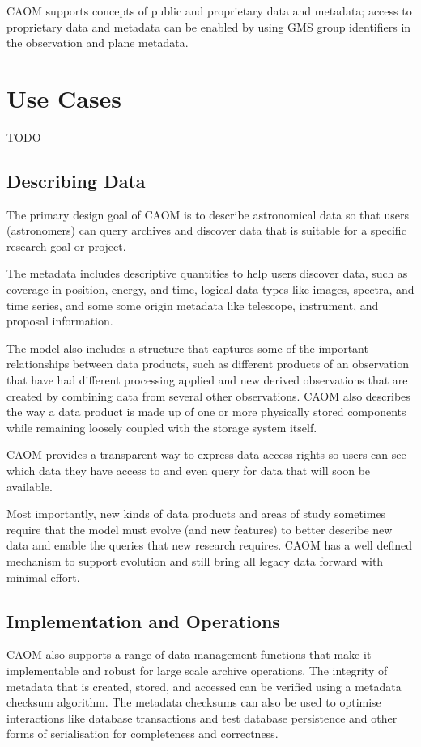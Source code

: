 \documentclass[11pt,a4paper]{ivoa}
\begin{document}
CAOM supports concepts of public and proprietary data and metadata; access to proprietary
data and metadata can be enabled by using GMS group identifiers in the observation and
plane metadata.

\section{Use Cases}

TODO

\subsection{Describing Data}

The primary design goal of CAOM is to describe astronomical data so that 
users (astronomers) can query archives and discover data that is suitable
for a specific research goal or project. 

The metadata includes descriptive quantities to help users discover data, 
such as coverage in position, energy, and time, logical data types like 
images, spectra, and time series, and some some origin metadata like 
telescope, instrument, and proposal information.

The model also includes a structure that captures some of the important relationships 
between data products, such as different products of an observation that have had
different processing applied and new derived observations that are created by 
combining data from several other observations. CAOM also describes the way a
data product is made up of one or more physically stored components while remaining
loosely coupled with the storage system itself.

CAOM provides a transparent way to express data access rights so users can see
which data they have access to and even query for data that will soon be available.

Most importantly, new kinds of data products and areas of study sometimes require 
that the model must evolve (and new features) to better describe new data and enable
the queries that new research requires. CAOM has a well defined mechanism to support
evolution and still bring all legacy data forward with minimal effort.

\subsection{Implementation and Operations}

CAOM also supports a range of data management functions that make it implementable
and robust for large scale archive operations. The integrity of metadata that is 
created, stored, and accessed can be verified using a metadata checksum algorithm.
The metadata checksums can also be used to optimise interactions like database 
transactions and test database persistence and other forms of serialisation for
completeness and correctness.
\end{document}
